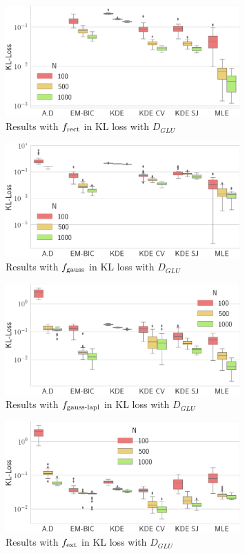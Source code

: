 \begin{figure}
\center
    \includegraphics[width=0.8\textwidth]{./TeX_files/res_rect_KL_GLU.png}
    \caption{Results with $f_{\textnormal{rect}}$ in KL loss with $D_{GLU}$}
    \label{fig:res_rect_KL_GLU}
\end{figure}
\begin{figure}
\center
    \includegraphics[width=0.8\textwidth]{./TeX_files/res_gauss_KL_GLU.png}
    \caption{Results with $f_{\textnormal{gauss}}$ in KL loss with $D_{GLU}$}
    \label{fig:res_gauss_KL_GLU}
\end{figure}   
\begin{figure}
\center
    \includegraphics[width=0.8\textwidth]{./TeX_files/res_lapl_gauss_KL_GLU.png}
    \caption{Results with $f_{\textnormal{gauss-lapl}}$ in KL loss with $D_{GLU}$}
    \label{fig:res_lapl_gauss_KL_GLU}
\end{figure}  
\begin{figure}
\center
    \includegraphics[width=0.8\textwidth]{./TeX_files/res_lapl_gauss_not_dict_KL_GLU.png}
    \caption{Results with $f_{\textnormal{ext}}$ in KL loss with $D_{GLU}$}
    \label{fig:res_ext_KL_GLU}
\end{figure} 
